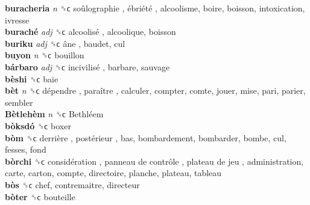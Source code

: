 \textbf{buracheria} \emph{n}  ␝ϲ   soûlographie ,  ébriété , alcoolisme, boire, boisson, intoxication, ivresse  \\
\textbf{buraché} \emph{adj}  ␝ϲ   alcoolisé , alcoolique, boisson  \\
\textbf{buriku} \emph{adj}  ␝ϲ   âne , baudet, cul  \\
\textbf{buyon} \emph{n}  ␝ϲ  bouillon  \\
\textbf{bárbaro} \emph{adj}  ␝ϲ   incivilisé , barbare, sauvage  \\
\textbf{bèshi} ␝ϲ  baie  \\
\textbf{bèt} \emph{n}  ␝ϲ   dépendre ,  paraître , calculer, compter, comte, jouer, mise, pari, parier, sembler  \\
\textbf{Bètlehèm} \emph{n}  ␝ϲ   Bethléem   \\
\textbf{bòksdó} ␝ϲ  boxer  \\
\textbf{bòm} ␝ϲ   derrière ,  postérieur , bas, bombardement, bombarder, bombe, cul, fesses, fond  \\
\textbf{bòrchi} ␝ϲ   considération ,  panneau de contrôle ,  plateau de jeu , administration, carte, carton, compte, directoire, planche, plateau, tableau  \\
\textbf{bòs} ␝ϲ  chef, contremaitre, directeur  \\
\textbf{bòter} ␝ϲ  bouteille  \\
